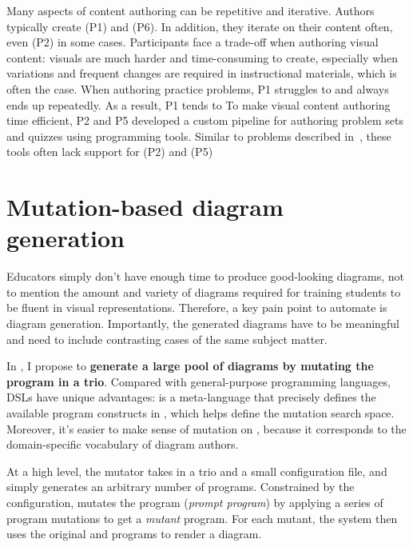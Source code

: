 Many aspects of content authoring can be repetitive and iterative. Authors typically create  (P1) and  (P6). In addition, they iterate on their content often, even  (P2) in some cases. Participants face a trade-off when authoring visual content: visuals are much harder and time-consuming to create, especially when variations and frequent changes are required in instructional materials, which is often the case. When authoring practice problems, P1 struggles to  and always ends up  repeatedly. As a result, P1 tends to \quotei{reuse [a few of my existing diagrams. Thinking about having to do it all over again for another class is just too much.} To make visual content authoring time efficient, P2 and P5 developed a custom pipeline for authoring problem sets and quizzes using programming tools. Similar to problems described in~\cite{naturalDiagramming}, these tools often lack support for  (P2) and  (P5) 

\section{Mutation-based diagram generation}
\label{sec:mutation}

Educators simply don't have enough time to produce good-looking diagrams, not to mention the amount and variety of diagrams required for training students to be fluent in visual representations. Therefore, a key pain point to automate is diagram generation. Importantly, the generated diagrams have to be meaningful and need to include contrasting cases of the same subject matter. 

In \Edgeworth, I propose to \textbf{generate a large pool of diagrams by mutating the \Substance program in a \Penrose trio}. Compared with general-purpose programming languages, \Penrose DSLs have unique advantages: \Domain is a meta-language that precisely defines the available program constructs in \Substance, which helps define the mutation search space. Moreover, it’s easier to make sense of mutation on \Substance, because it corresponds to the domain-specific vocabulary of diagram authors. 

At a high level, the \Edgeworth mutator takes in a \Penrose trio and a small configuration file, and simply generates an arbitrary number of \Substance programs. Constrained by the configuration, \Edgeworth mutates the \Substance program (\emph{prompt program}) by applying a series of program mutations to get a \emph{mutant} \Substance program. For each mutant, the system then uses the original \Style and \Domain programs to render a diagram. 
 
